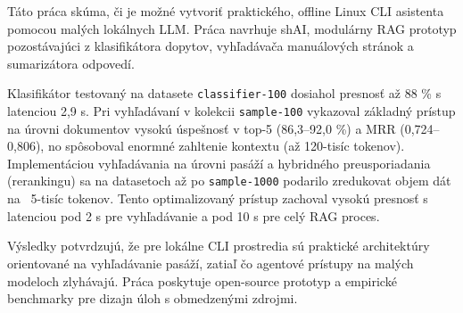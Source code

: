 Táto práca skúma, či je možné vytvoriť praktického, offline Linux CLI
asistenta pomocou malých lokálnych LLM. Práca navrhuje shAI, modulárny
RAG prototyp pozostávajúci z klasifikátora dopytov, vyhľadávača
manuálových stránok a sumarizátora odpovedí.

Klasifikátor testovaný na datasete \texttt{classifier-100} dosiahol presnosť až
88 \% s latenciou 2,9 s. Pri vyhľadávaní v kolekcii \texttt{sample-100}
vykazoval základný prístup na úrovni dokumentov vysokú úspešnosť v top-5
(86,3--92,0 \%) a MRR (0,724--0,806), no spôsoboval enormné zahltenie kontextu
(až 120-tisíc tokenov). Implementáciou vyhľadávania na úrovni pasáží a
hybridného preusporiadania (rerankingu) sa na datasetoch až po
\texttt{sample-1000} podarilo zredukovat objem dát na ~5-tisíc tokenov. Tento
optimalizovaný prístup zachoval vysokú presnosť s latenciou pod 2 s pre
vyhľadávanie a pod 10 s pre celý RAG proces.

Výsledky potvrdzujú, že pre lokálne CLI prostredia sú praktické
architektúry orientované na vyhľadávanie pasáží, zatiaľ čo agentové prístupy na
malých modeloch zlyhávajú. Práca poskytuje open-source prototyp a empirické
benchmarky pre dizajn úloh s obmedzenými zdrojmi.
